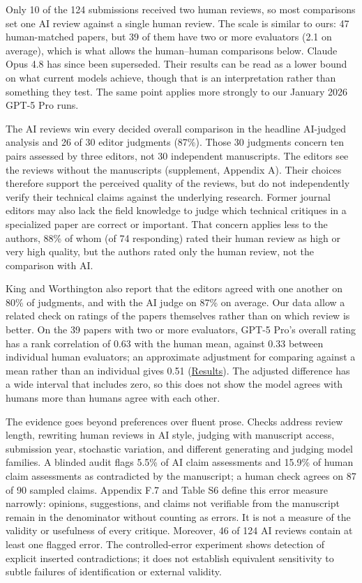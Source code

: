\documentclass[
  11pt,
  letterpaper,
]{article}
\begin{document}
Only 10 of the 124 submissions received two human reviews, so most
comparisons set one AI review against a single human review. The scale
is similar to ours: 47 human-matched papers, but 39 of them have two or
more evaluators (2.1 on average), which is what allows the human--human
comparisons below. Claude Opus 4.8 has since been superseded. Their
results can be read as a lower bound on what current models achieve,
though that is an interpretation rather than something they test. The
same point applies more strongly to our January 2026 GPT-5 Pro runs.

The AI reviews win every decided overall comparison in the headline
AI-judged analysis and 26 of 30 editor judgments (87\%). Those 30
judgments concern ten pairs assessed by three editors, not 30
independent manuscripts. The editors see the reviews without the
manuscripts (supplement, Appendix A). Their choices therefore support
the perceived quality of the reviews, but do not independently verify
their technical claims against the underlying research. Former journal
editors may also lack the field knowledge to judge which technical
critiques in a specialized paper are correct or important. That concern
applies less to the authors, 88\% of whom (of 74 responding) rated their
human review as high or very high quality, but the authors rated only
the human review, not the comparison with AI.

King and Worthington also report that the editors agreed with one
another on 80\% of judgments, and with the AI judge on 87\% on average.
Our data allow a related check on ratings of the papers themselves
rather than on which review is better. On the 39 papers with two or more
evaluators, GPT-5 Pro's overall rating has a rank correlation of 0.63
with the human mean, against 0.33 between individual human evaluators;
an approximate adjustment for comparing against a mean rather than an
individual gives 0.51 (\hyperref[tbl-model-agreement-main]{Results}).
The adjusted difference has a wide interval that includes zero, so this
does not show the model agrees with humans more than humans agree with
each other.

The evidence goes beyond preferences over fluent prose. Checks address
review length, rewriting human reviews in AI style, judging with
manuscript access, submission year, stochastic variation, and different
generating and judging model families. A blinded audit flags 5.5\% of AI
claim assessments and 15.9\% of human claim assessments as contradicted
by the manuscript; a human check agrees on 87 of 90 sampled claims.
Appendix F.7 and Table S6 define this error measure narrowly: opinions,
suggestions, and claims not verifiable from the manuscript remain in the
denominator without counting as errors. It is not a measure of the
validity or usefulness of every critique. Moreover, 46 of 124 AI reviews
contain at least one flagged error. The controlled-error experiment
shows detection of explicit inserted contradictions; it does not
establish equivalent sensitivity to subtle failures of identification or
external validity.
\end{document}

